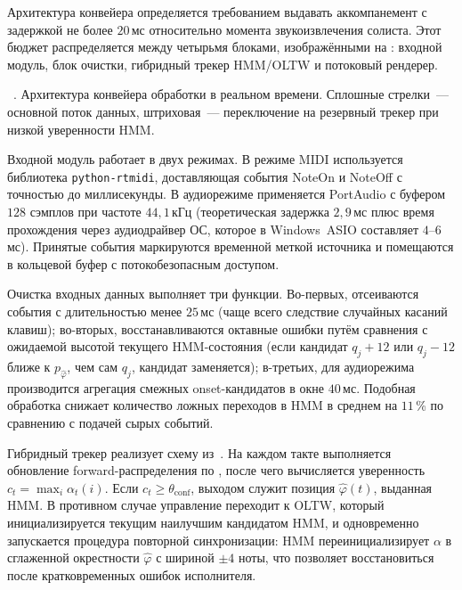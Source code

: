 %
Архитектура конвейера определяется требованием выдавать
аккомпанемент с задержкой не более $20$\,мс относительно момента
звукоизвлечения солиста. Этот бюджет распределяется между четырьмя
блоками, изображёнными на : входной модуль,
блок очистки, гибридный трекер HMM/OLTW и потоковый рендерер.

\par\addvspace{2pt}
{\centering
{}%
\resizebox{\columnwidth}{!}{}\par
\vspace{2pt}
\footnotesize
\figurename~\thefigure. Архитектура конвейера обработки в реальном
времени. Сплошные стрелки~--- основной поток данных, штриховая~---
переключение на резервный трекер при низкой уверенности HMM.\par}
\addvspace{4pt}

Входной модуль работает в двух режимах. В режиме MIDI используется
библиотека \texttt{python-rtmidi}, доставляющая события NoteOn и
NoteOff с точностью до миллисекунды. В аудиорежиме применяется
PortAudio с буфером $128$ сэмплов при частоте $44{,}1$\,кГц
(теоретическая задержка $2{,}9$\,мс плюс время прохождения через
аудиодрайвер ОС, которое в Windows~ASIO составляет $4$--$6$\,мс).
Принятые события маркируются временной меткой источника и помещаются
в кольцевой буфер с потокобезопасным доступом.

Очистка входных данных выполняет три функции. Во-первых, отсеиваются
события с длительностью менее $25$\,мс (чаще всего следствие случайных
касаний клавиш); во-вторых, восстанавливаются октавные ошибки путём
сравнения с ожидаемой высотой текущего HMM-состояния (если кандидат
$q_j+12$ или $q_j-12$ ближе к $p_{\hat\varphi}$, чем сам $q_j$,
кандидат заменяется); в-третьих, для аудиорежима производится
агрегация смежных onset-кандидатов в окне $40$\,мс. Подобная обработка
снижает количество ложных переходов в HMM в среднем на $11$\,\% по
сравнению с подачей сырых событий.

Гибридный трекер реализует схему из~. На каждом
такте выполняется обновление forward-распределения по
, после чего вычисляется уверенность
$c_t=\max_i\alpha_t(i)$. Если $c_t\ge\theta_{\text{conf}}$, выходом
служит позиция $\hat\varphi(t)$, выданная HMM. В противном случае
управление переходит к OLTW, который инициализируется текущим
наилучшим кандидатом HMM, и одновременно запускается процедура
повторной синхронизации: HMM переинициализирует $\alpha$ в
сглаженной окрестности $\hat\varphi$ с шириной $\pm 4$ ноты, что
позволяет восстановиться после кратковременных ошибок исполнителя.

